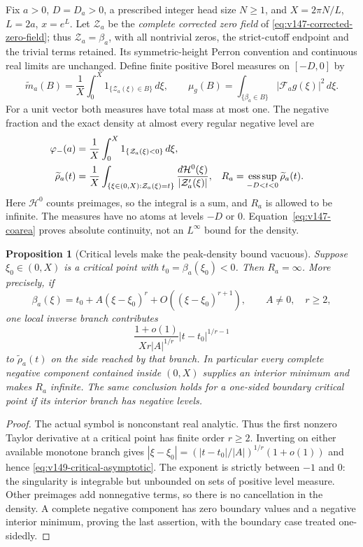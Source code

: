 \documentclass[11pt]{article}
\newtheorem{proposition}[theorem]{Proposition}
\theoremstyle{remark}
\begin{document}
Fix $a>0$, $D=D_a>0$, a prescribed integer head size $N\ge1$, and $X=2\pi N/L$,
$L=2a$, $x=e^L$. Let $\mathcal Z_a$ be the \emph{complete corrected zero field}
of \eqref{eq:v147-corrected-zero-field}; thus $\mathcal Z_a=\beta_a$,
with all nontrivial zeros, the strict-cutoff endpoint and the trivial
terms retained. Its symmetric-height Perron convention and continuous
real limits are unchanged. Define finite positive Borel measures on
$[-D,0]$ by
\begin{equation}\label{eq:v149-measures}
 \widetilde m_a(B)=\frac1X\int_0^X
               1_{\{\mathcal Z_a(\xi)\in B\}}\,d\xi,
 \qquad
 \mu_g(B)=\int_{\{\beta_a\in B\}}|\mathcal F_ag(\xi)|^2\,d\xi.
\end{equation}
For a unit vector both measures have total mass at most one. The negative
fraction and the exact density at almost every regular negative level are
\begin{align}
 \varphi_-(a)&=\frac1X\int_0^X1_{\{\mathcal Z_a(\xi)<0\}}\,d\xi,
 \notag\\
 \widetilde\rho_a(t)&=\frac1X
  \int_{\{\xi\in(0,X):\mathcal Z_a(\xi)=t\}}
       \frac{d\mathcal H^0(\xi)}{|\mathcal Z_a'(\xi)|},
 &R_a&=\mathop{\rm ess\,sup}_{-D<t<0}\widetilde\rho_a(t).
 \label{eq:v149-zero-density}
\end{align}
Here $\mathcal H^0$ counts preimages, so the integral is a sum, and
$R_a$ is allowed to be infinite. The measures have no atoms at levels
$-D$ or $0$. Equation~\eqref{eq:v147-coarea} proves absolute continuity,
not an $L^\infty$ bound for the density.

\begin{proposition}[Critical levels make the peak-density bound vacuous]
\label{prop:v149-critical-density}
Suppose $\xi_0\in(0,X)$ is a critical point with
$t_0=\beta_a(\xi_0)<0$. Then $R_a=\infty$. More precisely, if
\[
 \beta_a(\xi)=t_0+A(\xi-\xi_0)^r+O((\xi-\xi_0)^{r+1}),
 \qquad A\ne0,\quad r\ge2,
\]
one local inverse branch contributes
\begin{equation}\label{eq:v149-critical-asymptotic}
 \frac{1+o(1)}{Xr|A|^{1/r}}
               |t-t_0|^{1/r-1}
\end{equation}
to $\widetilde\rho_a(t)$ on the side reached by that branch.
In particular every complete negative component contained inside
$(0,X)$ supplies an interior minimum and makes $R_a$ infinite.
The same conclusion holds for a one-sided boundary critical point if
its interior branch has negative levels.
\end{proposition}
\begin{proof}
The actual symbol is nonconstant real analytic. Thus the first nonzero
Taylor derivative at a critical point has finite order $r\ge2$.
Inverting on either available monotone branch gives
$|\xi-\xi_0|=(|t-t_0|/|A|)^{1/r}(1+o(1))$ and hence
\eqref{eq:v149-critical-asymptotic}. The exponent is strictly between
$-1$ and $0$: the singularity is integrable but unbounded on sets of
positive level measure. Other preimages add nonnegative terms, so
there is no cancellation in the density. A complete negative component
has zero boundary values and a negative interior minimum, proving the
last assertion, with the boundary case treated one-sidedly.
\end{proof}
\end{document}
